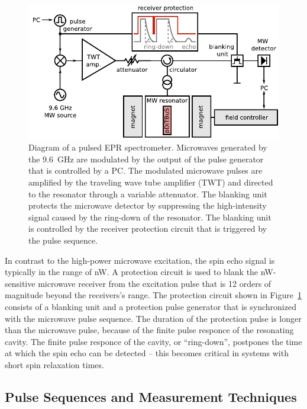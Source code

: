 \begin{figure}[h]
\center
	\includegraphics[width=1\textwidth]{./pulse/figures/pEPR_spectrometer_diagram.pdf}
	\caption{Diagram of a pulsed EPR spectrometer. Microwaves generated by the 9.6~GHz are modulated by the output of the pulse generator that is controlled by a PC. The modulated microwave pulses are amplified by the traveling wave tube amplifier (TWT) and directed to the resonator through a variable attenuator. The blanking unit protects the microwave detector by suppressing the high-intensity signal caused by the ring-down of the resonator. The blanking unit is controlled by the receiver protection circuit that is triggered by the pulse sequence.}
	\label{fig:pepr_spectrometer_diagram}
\end{figure}

In contrast to the high-power microwave excitation, the spin echo signal is typically in the range of nW. A protection circuit is used to blank the nW-sensitive microwave receiver from the excitation pulse that is 12 orders of magnitude beyond the receivers's range. The protection circuit shown in Figure~\ref{fig:pepr_spectrometer_diagram} consists of a blanking unit and a protection pulse generator that is synchronized with the microwave pulse sequence. The duration of the protection pulse is longer than the microwave pulse, because of the finite pulse responce of the resonating cavity. The finite pulse responce of the cavity, or ``ring-down'', postpones the time at which the spin echo can be detected -- this becomes critical in systems with short spin relaxation times.

\subsection{Pulse Sequences and Measurement Techniques}
